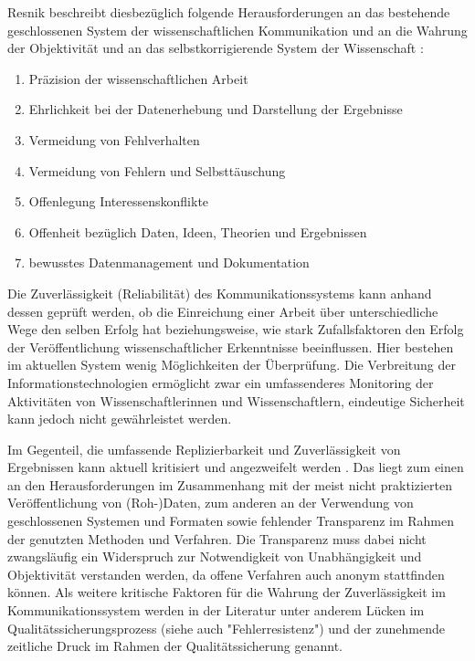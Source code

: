 Resnik beschreibt diesbezüglich folgende Herausforderungen an das bestehende geschlossenen System der wissenschaftlichen Kommunikation und an die Wahrung der Objektivität und an das selbstkorrigierende System der Wissenschaft \cite{Resnik_2005}:
\begin{enumerate}
\item Präzision der wissenschaftlichen Arbeit
\item Ehrlichkeit bei der Datenerhebung und Darstellung der Ergebnisse
\item Vermeidung von Fehlverhalten
\item Vermeidung von Fehlern und Selbsttäuschung
\item Offenlegung Interessenskonflikte
\item Offenheit bezüglich Daten, Ideen, Theorien und  Ergebnissen
\item bewusstes Datenmanagement und Dokumentation
\end{enumerate}

Die Zuverlässigkeit (Reliabilität) des Kommunikationssystems kann anhand dessen geprüft werden, ob die Einreichung einer Arbeit über unterschiedliche Wege den selben Erfolg hat beziehungsweise, wie stark Zufallsfaktoren den Erfolg der Veröffentlichung wissenschaftlicher Erkenntnisse beeinflussen. Hier bestehen im aktuellen System wenig Möglichkeiten der Überprüfung. Die Verbreitung der Informationstechnologien ermöglicht zwar ein umfassenderes Monitoring der Aktivitäten von Wissenschaftlerinnen und Wissenschaftlern, eindeutige Sicherheit kann jedoch nicht gewährleistet werden.

Im Gegenteil, die umfassende Replizierbarkeit und Zuverlässigkeit von Ergebnissen kann aktuell kritisiert und angezweifelt werden \cite{Luescher_2014}. Das liegt zum einen an den Herausforderungen im Zusammenhang mit der meist nicht praktizierten Veröffentlichung von (Roh-)Daten, zum anderen an der Verwendung von geschlossenen Systemen und Formaten sowie fehlender Transparenz im Rahmen der genutzten Methoden und Verfahren. Die Transparenz muss dabei nicht zwangsläufig ein Widerspruch zur Notwendigkeit von Unabhängigkeit und Objektivität verstanden werden, da offene Verfahren auch anonym stattfinden können. Als weitere kritische Faktoren für die Wahrung der Zuverlässigkeit im Kommunikationssystem werden in der Literatur unter anderem Lücken im Qualitätssicherungsprozess (siehe auch "Fehlerresistenz") \cite{Bar_2009} und der zunehmende zeitliche Druck im Rahmen der Qualitätssicherung \cite{Luescher_2014} genannt.

